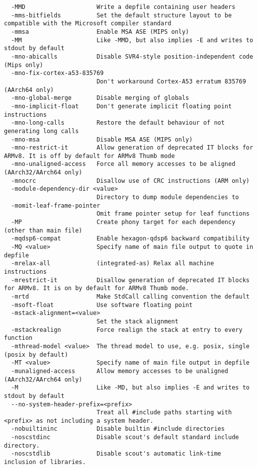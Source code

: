 \begin{verbatim}
  -MMD                    Write a depfile containing user headers
  -mms-bitfields          Set the default structure layout to be compatible with the Microsoft compiler standard
  -mmsa                   Enable MSA ASE (MIPS only)
  -MM                     Like -MMD, but also implies -E and writes to stdout by default
  -mno-abicalls           Disable SVR4-style position-independent code (Mips only)
  -mno-fix-cortex-a53-835769
                          Don't workaround Cortex-A53 erratum 835769 (AArch64 only)
  -mno-global-merge       Disable merging of globals
  -mno-implicit-float     Don't generate implicit floating point instructions
  -mno-long-calls         Restore the default behaviour of not generating long calls
  -mno-msa                Disable MSA ASE (MIPS only)
  -mno-restrict-it        Allow generation of deprecated IT blocks for ARMv8. It is off by default for ARMv8 Thumb mode
  -mno-unaligned-access   Force all memory accesses to be aligned (AArch32/AArch64 only)
  -mnocrc                 Disallow use of CRC instructions (ARM only)
  -module-dependency-dir <value>
                          Directory to dump module dependencies to
  -momit-leaf-frame-pointer
                          Omit frame pointer setup for leaf functions
  -MP                     Create phony target for each dependency (other than main file)
  -mqdsp6-compat          Enable hexagon-qdsp6 backward compatibility
  -MQ <value>             Specify name of main file output to quote in depfile
  -mrelax-all             (integrated-as) Relax all machine instructions
  -mrestrict-it           Disallow generation of deprecated IT blocks for ARMv8. It is on by default for ARMv8 Thumb mode.
  -mrtd                   Make StdCall calling convention the default
  -msoft-float            Use software floating point
  -mstack-alignment=<value>
                          Set the stack alignment
  -mstackrealign          Force realign the stack at entry to every function
  -mthread-model <value>  The thread model to use, e.g. posix, single (posix by default)
  -MT <value>             Specify name of main file output in depfile
  -munaligned-access      Allow memory accesses to be unaligned (AArch32/AArch64 only)
  -M                      Like -MD, but also implies -E and writes to stdout by default
  --no-system-header-prefix=<prefix>
                          Treat all #include paths starting with <prefix> as not including a system header.
  -nobuiltininc           Disable builtin #include directories
  -noscstdinc             Disable scout's default standard include directory.
  -noscstdlib             Disable scout's automatic link-time inclusion of libraries.

\end{verbatim}
